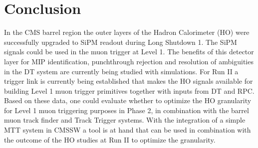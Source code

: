 \section{Conclusion}
	In the CMS barrel region the outer layers of the Hadron Calorimeter (HO) were successfully upgraded to SiPM readout during Long Shutdown 1.
	The SiPM signals could be used in the muon trigger at Level 1.
	The benefits of this detector layer for MIP identification, punchthrough rejection and resolution of ambiguities in the DT system are
	currently being studied with simulations.
	For Run II a trigger link is currently being established that makes the HO signals available for building Level 1 muon trigger primitives together with inputs from DT and RPC. Based on these data,
	one could evaluate whether to optimize the HO granularity for Level 1 muon triggering purposes in Phase 2, in combination with the barrel muon track finder and Track Trigger systems.
	With the integration of a simple MTT system in CMSSW a tool is at hand that can be used in combination with the outcome of the HO studies at Run II to optimize the granularity.